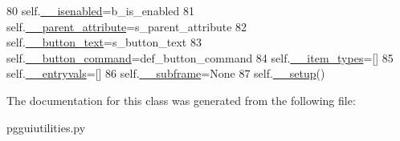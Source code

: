 \begin{DoxyCode}
80         self.\hyperlink{classpgguiutilities_1_1KeyValFrame_ada8967e6781fa12b1762743d9067e60e}{\_\_isenabled}=b\_is\_enabled
81         self.\hyperlink{classpgguiutilities_1_1KeyValFrame_aaa6647cd1f0ac3507b17af60dfd027c0}{\_\_parent\_attribute}=s\_parent\_attribute
82         self.\hyperlink{classpgguiutilities_1_1KeyValFrame_a5b328146665db32e26842f431e41675c}{\_\_button\_text}=s\_button\_text
83         self.\hyperlink{classpgguiutilities_1_1KeyValFrame_a233f2b774ddee5410e5f4bf9379fa122}{\_\_button\_command}=def\_button\_command
84         self.\hyperlink{classpgguiutilities_1_1KeyValFrame_a6edcea179fa3078c6e6a17c5f0b21b08}{\_\_item\_types}=[]
85         self.\hyperlink{classpgguiutilities_1_1KeyValFrame_a9445a556b65b9744be3000e25b805133}{\_\_entryvals}=[]
86         self.\hyperlink{classpgguiutilities_1_1KeyValFrame_ab095337005038fe84f406485537a31dd}{\_\_subframe}=\textcolor{keywordtype}{None}
87         self.\hyperlink{classpgguiutilities_1_1KeyValFrame_af6a8538c51d0cf64b46e60ac48a37fdc}{\_\_setup}()
\end{DoxyCode}


The documentation for this class was generated from the following file\+:\begin{DoxyCompactItemize}
\item 
pgguiutilities.\+py\end{DoxyCompactItemize}
